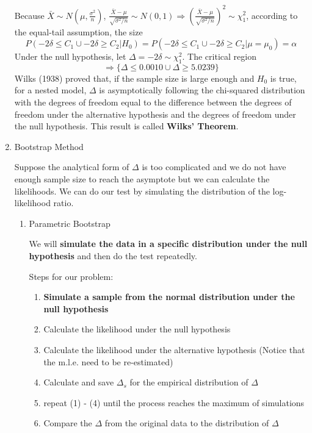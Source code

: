 \begin{enumerate}
		Because $\bar{X} \sim N(\mu, \frac{\sigma^2}{n})$, $\frac{\bar{X} - \mu}{\sqrt{\sigma^2/n}} \sim N(0, 1) \Rightarrow (\frac{\bar{X} - \mu}{\sqrt{\sigma^2/n}})^2 \sim \chi^2_1$, according to the equal-tail assumption, the size
		\begin{equation*}
			P( -2\delta \le C_1\cup -2\delta \ge C_2 | H_0 ) = P(  -2\delta \le C_1 \cup-2\delta \ge C_2 | \mu = \mu_0 ) = \alpha  
		\end{equation*}	
		Under the null hypothesis, let $\Delta = -2\delta \sim \chi^2_1$. The critical region	 
		\begin{equation*}
			\Rightarrow \{   \Delta \le 0.0010\cup \Delta \ge 5.0239\}
		\end{equation*}
		Wilks (1938) \cite{Wilks} proved that, if the sample size is large enough and $H_0$ is true, for a nested model, $\Delta$ is asymptotically following the chi-squared distribution with the degrees of freedom equal to the difference between the degrees of freedom under the alternative hypothesis and the degrees of freedom under the null hypothesis. This result is called \textbf{Wilks' Theorem}.
	\item Bootstrap Method
		\par Suppose the analytical form of $\Delta$ is too complicated and we do not have enough sample size to reach the asymptote but we can calculate the likelihoods. We can do our test by simulating the distribution of the log-likelihood ratio.
		\begin{enumerate}
			\item Parametric Bootstrap
				\par We will \textbf{simulate the data in a specific distribution under the null hypothesis} and then do the test repeatedly. 
				\par Steps for our problem:
				\begin{enumerate}
					\item \textbf{Simulate a sample from the normal distribution under the null hypothesis}
					\item Calculate the likelihood under the null hypothesis
					\item Calculate the likelihood under the alternative hypothesis (Notice that the m.l.e. need to be re-estimated)
					\item Calculate and save $\Delta_s$ for the empirical distribution of $\Delta$
					\item repeat (1) - (4) until the process reaches the maximum of simulations
					\item Compare the $\Delta$ from the original data to the distribution of $\Delta$

\end{enumerate}
\end{enumerate}
\end{enumerate}
